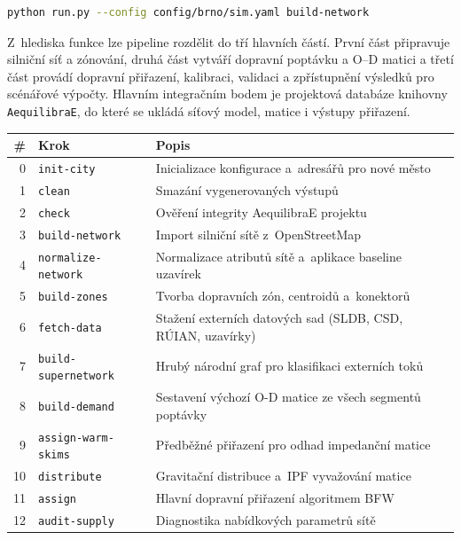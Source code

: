 \begin{lstlisting}[language=bash, caption={Spuštění kroku \texttt{build-network} pro model Brna.}, label={lst:run-build-network}]
python run.py --config config/brno/sim.yaml build-network
\end{lstlisting}

Z~hlediska funkce lze pipeline rozdělit do tří hlavních částí. První část připravuje silniční síť a zónování, druhá část vytváří dopravní poptávku a O--D matici a třetí část provádí dopravní přiřazení, kalibraci, validaci a zpřístupnění výsledků pro scénářové výpočty. Hlavním integračním bodem je projektová databáze knihovny \texttt{AequilibraE}, do které se ukládá síťový model, matice i výstupy přiřazení.

\begin{table}[ht]
\centering
\small
\begin{tabular}{rll}
\toprule
\textbf{\#} & \textbf{Krok} & \textbf{Popis} \\
\midrule
0  & \texttt{init-city}         & Inicializace konfigurace a~adresářů pro nové město \\
1  & \texttt{clean}             & Smazání vygenerovaných výstupů \\
2  & \texttt{check}             & Ověření integrity AequilibraE projektu \\
3  & \texttt{build-network}     & Import silniční sítě z~OpenStreetMap \\
4  & \texttt{normalize-network} & Normalizace atributů sítě a~aplikace baseline uzavírek \\
5  & \texttt{build-zones}       & Tvorba dopravních zón, centroidů a~konektorů \\
6  & \texttt{fetch-data}        & Stažení externích datových sad (SLDB, CSD, RÚIAN, uzavírky) \\
7  & \texttt{build-supernetwork}& Hrubý národní graf pro klasifikaci externích toků \\
8  & \texttt{build-demand}      & Sestavení výchozí O-D matice ze všech segmentů poptávky \\
9  & \texttt{assign-warm-skims} & Předběžné přiřazení pro odhad impedanční matice \\
10 & \texttt{distribute}        & Gravitační distribuce a~IPF vyvažování matice \\
11 & \texttt{assign}            & Hlavní dopravní přiřazení algoritmem BFW \\
12 & \texttt{audit-supply}      & Diagnostika nabídkových parametrů sítě \\

\end{tabular}
\end{table}
